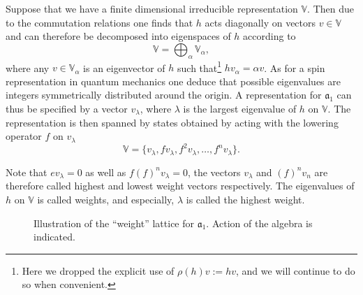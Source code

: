 Suppose that we have a finite dimensional irreducible representation $\mathbb{V}$. Then due to the commutation relations one finds that $h$ acts diagonally on vectors $v\in \mathbb{V}$ and can therefore be decomposed into eigenspaces of $h$ according to
\begin{equation}
    \mathbb{V} = \bigoplus_\alpha \mathbb{V}_\alpha,
\end{equation}
where any $v\in\mathbb{V}_\alpha$ is an eigenvector of $h$ such that\footnote{Here we dropped the explicit use of $\rho(h)v :=hv$, and we will continue to do so when convenient.} $hv_\alpha = \alpha v$. As for a spin representation in quantum mechanics one deduce that possible eigenvalues are integers symmetrically distributed around the origin. A representation for $\mathfrak{a}_1$ can thus be specified by a vector $v_\lambda$, where $\lambda$ is the largest eigenvalue of $h$ on $\mathbb{V}$. The representation is then spanned by states obtained by acting with the lowering operator $f$ on $v_\lambda$ 
\begin{equation}
    \mathbb{V} = \{v_\lambda,fv_\lambda,f^2v_\lambda,\ldots,f^{n}v_\lambda\}.
\end{equation}

Note that $ev_\lambda = 0$ as well as $f(f)^{n}v_\lambda=0$, the vectors $v_\lambda$ and $(f)^{n}v_n$ are therefore called highest and lowest weight vectors respectively. The eigenvalues of $h$ on $\mathbb{V}$ is called weights, and especially, $\lambda$ is called the highest weight. 

\begin{figure}
    \centering
    \caption{Illustration of the ``weight'' lattice for $\mathfrak{a}_1$. Action of the algebra is indicated. }
    \label{fig:SlTwoRep}
\end{figure}



